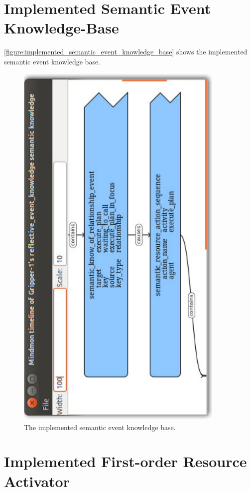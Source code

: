 \section{Implemented Semantic Event Knowledge-Base}

{\mbox{\autoref{figure:implemented_semantic_event_knowledge_base}}} shows the
implemented semantic event knowledge base.
\begin{figure}
\includegraphics[width=10cm]{gfx/implemented_semantic_event_knowledge_base}
\caption[The implemented semantic event knowledge base.]{The
  implemented semantic event knowledge base.}
\label{figure:implemented_semantic_event_knowledge_base}
\end{figure}

\section{Implemented First-order Resource Activator}

